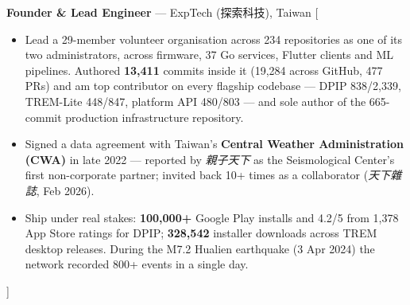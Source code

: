 \documentclass{resume}
\begin{document}
\begin{experiences}
    {\textbf{Founder \& Lead Engineer} --- ExpTech (探索科技), Taiwan}%
    [\begin{itemize}
      \item Lead a 29-member volunteer organisation across 234 repositories as one of its two
        administrators, across firmware, 37 Go services, Flutter clients and ML pipelines. Authored
        \textbf{13,411} commits inside it (19,284 across GitHub, 477 PRs) and am top contributor on every
        flagship codebase --- DPIP 838/2,339, TREM-Lite 448/847, platform API 480/803 --- and sole author
        of the 665-commit production infrastructure repository.
      \item Signed a data agreement with Taiwan's \textbf{Central Weather Administration (CWA)} in late
        2022 --- reported by \emph{親子天下} as the Seismological Center's first non-corporate partner;
        invited back 10+ times as a collaborator (\emph{天下雜誌}, Feb 2026).
      \item Ship under real stakes: \textbf{100,000+} Google Play installs and 4.2/5 from 1,378
        App Store ratings for DPIP; \textbf{328,542} installer downloads across TREM desktop
        releases. During the M7.2 Hualien earthquake (3 Apr 2024) the network recorded
        800+ events in a single day.
    \end{itemize}]
\end{experiences}
\end{document}

